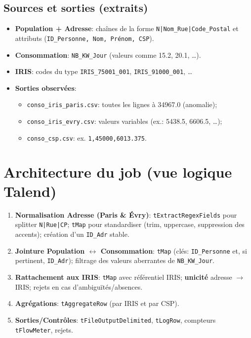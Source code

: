 \subsection{Sources et sorties (extraits)}
\begin{itemize}
\item \textbf{Population + Adresse}: chaînes de la forme \texttt{N|Nom_Rue|Code_Postal} et attributs (\texttt{ID_Personne, Nom, Prénom, CSP}).
\item \textbf{Consommation}: \texttt{NB_KW_Jour} (valeurs comme 15.2, 20.1, \dots).
\item \textbf{IRIS}: codes du type \texttt{IRIS_75001_001}, \texttt{IRIS_91000_001}, \dots
\item \textbf{Sorties observées}:
\begin{itemize}
\item \texttt{conso_iris_paris.csv}: toutes les lignes à \num{34967.0} (anomalie);
\item \texttt{conso_iris_evry.csv}: valeurs variables (ex.: \num{5438.5}, \num{6606.5}, \dots);
\item \texttt{conso_csp.csv}: ex. \texttt{1,45000,6013.375}.
\end{itemize}
\end{itemize}

\section{Architecture du job (vue logique Talend)}
\begin{enumerate}
\item \textbf{Normalisation Adresse (Paris & Évry)}: \texttt{tExtractRegexFields} pour splitter \texttt{N|Rue|CP}; \texttt{tMap} pour standardiser (trim, uppercase, suppression des accents); création d'un \texttt{ID_Adr} stable.
\item \textbf{Jointure Population $\leftrightarrow$ Consommation}: \texttt{tMap} (clés: \texttt{ID_Personne} et, si pertinent, \texttt{ID_Adr}); filtrage des valeurs aberrantes de \texttt{NB_KW_Jour}.
\item \textbf{Rattachement aux IRIS}: \texttt{tMap} avec référentiel IRIS; \textbf{unicité} adresse $\rightarrow$ IRIS; rejets en cas d'ambiguïtés/absences.
\item \textbf{Agrégations}: \texttt{tAggregateRow} (par IRIS et par CSP).
\item \textbf{Sorties/Contrôles}: \texttt{tFileOutputDelimited}, \texttt{tLogRow}, compteurs \texttt{tFlowMeter}, rejets.
\end{enumerate}

